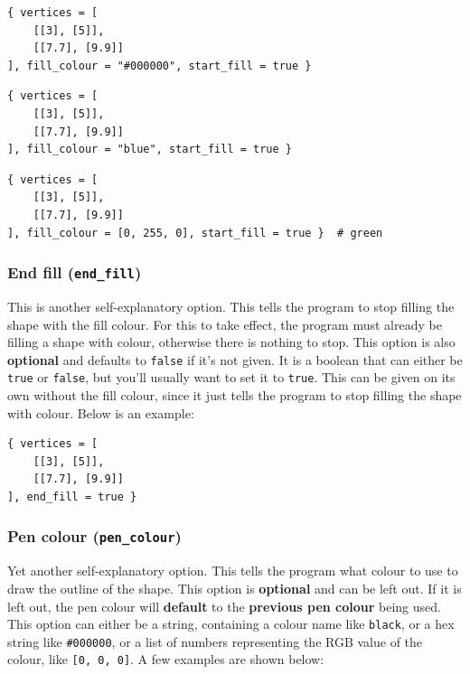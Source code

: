 \documentclass[11pt]{article}
\begin{document}
\begin{verbatim}
{ vertices = [
    [[3], [5]],
    [[7.7], [9.9]]
], fill_colour = "#000000", start_fill = true }
\end{verbatim}

\begin{verbatim}
{ vertices = [
    [[3], [5]],
    [[7.7], [9.9]]
], fill_colour = "blue", start_fill = true }
\end{verbatim}

\begin{verbatim}
{ vertices = [
    [[3], [5]],
    [[7.7], [9.9]]
], fill_colour = [0, 255, 0], start_fill = true }  # green
\end{verbatim}

\subsubsection{End fill (\texttt{end\_fill})}
\label{sec:org65d1e8b}
This is another self-explanatory option. This tells the program to stop filling the shape with the fill colour. For this to take effect, the program must already be filling a shape with colour, otherwise there is nothing to stop. This option is also \textbf{optional} and defaults to \texttt{false} if it's not given. It is a boolean that can either be \texttt{true} or \texttt{false}, but you'll usually want to set it to \texttt{true}. This can be given on its own without the fill colour, since it just tells the program to stop filling the shape with colour. Below is an example:

\begin{verbatim}
{ vertices = [
    [[3], [5]],
    [[7.7], [9.9]]
], end_fill = true }
\end{verbatim}

\subsubsection{Pen colour (\texttt{pen\_colour})}
\label{sec:orge94e6c5}
Yet another self-explanatory option. This tells the program what colour to use to draw the outline of the shape. This option is \textbf{optional} and can be left out. If it is left out, the pen colour will \textbf{default} to the \textbf{previous pen colour} being used. This option can either be a string, containing a colour name like \texttt{black}, or a hex string like \texttt{\#000000}, or a list of numbers representing the RGB value of the colour, like \texttt{[0, 0, 0]}. A few examples are shown below:
\end{document}
